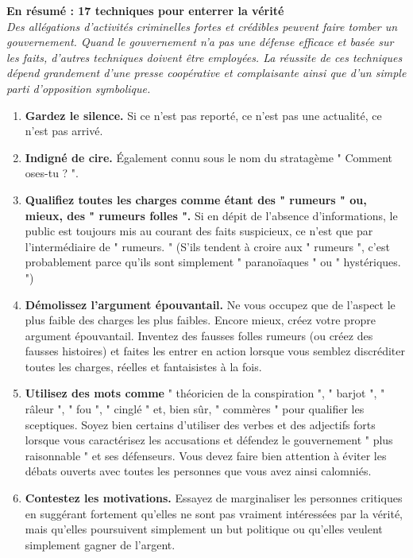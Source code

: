 \documentclass[11pt,twoside,a4paper]{article}
\begin{document}
\textbf{\Large En r{\'e}sum{\'e} : 17 techniques pour enterrer la v{\'e}rit{\'e}}~\\

\emph{Des all{\'e}gations d'activit{\'e}s criminelles fortes et cr{\'e}dibles peuvent faire tomber un gouvernement. Quand le gouvernement n'a pas une d{\'e}fense efficace et bas{\'e}e sur les faits, d'autres techniques doivent {\^e}tre employ{\'e}es. La r{\'e}ussite de ces techniques d{\'e}pend grandement d'une presse coop{\'e}rative et complaisante ainsi que d'un simple parti d'opposition symbolique.}~\\

\setlength\parindent{20pt}
\begin{enumerate}
	\item \textbf{Gardez le silence. } Si ce n'est pas report{\'e}, ce n'est pas une actualit{\'e}, ce n'est pas arriv{\'e}.
	\item \textbf{Indign{\'e} de cire. } {\'E}galement connu sous le nom du stratag{\`e}me " Comment oses-tu ? ".
	\item \textbf{Qualifiez toutes les charges comme {\'e}tant des " rumeurs " ou, mieux, des " rumeurs folles ". } Si en d{\'e}pit de l'absence d'informations, le public est toujours mis au courant des faits suspicieux, ce n'est que par l'interm{\'e}diaire de " rumeurs. " (S'ils tendent {\`a} croire aux " rumeurs ", c'est probablement parce qu'ils sont simplement " parano{\"i}aques " ou " hyst{\'e}riques. ")
	\item \textbf{D{\'e}molissez l'argument {\'e}pouvantail. } Ne vous occupez que de l'aspect le plus faible des charges les plus faibles. Encore mieux, cr{\'e}ez votre propre argument {\'e}pouvantail. Inventez des fausses folles rumeurs (ou cr{\'e}ez des fausses histoires) et faites les entrer en action lorsque vous semblez discr{\'e}diter toutes les charges, r{\'e}elles et fantaisistes {\`a} la fois.
	\item \textbf{Utilisez des mots comme } " th{\'e}oricien de la conspiration ", " barjot ", " r{\^a}leur ", " fou ", " cingl{\'e} " et, bien s{\^u}r, " comm{\`e}res " pour qualifier les sceptiques. Soyez bien certains d'utiliser des verbes et des adjectifs forts lorsque vous caract{\'e}risez les accusations et d{\'e}fendez le gouvernement " plus raisonnable " et ses d{\'e}fenseurs. Vous devez faire bien attention {\`a} {\'e}viter les d{\'e}bats ouverts avec toutes les personnes que vous avez ainsi calomni{\'e}s.
	\item \textbf{Contestez les motivations. } Essayez de marginaliser les personnes critiques en sugg{\'e}rant fortement qu'elles ne sont pas vraiment int{\'e}ress{\'e}es par la v{\'e}rit{\'e}, mais qu'elles poursuivent simplement un but politique ou qu'elles veulent simplement gagner de l'argent.

\end{enumerate}
\end{document}
